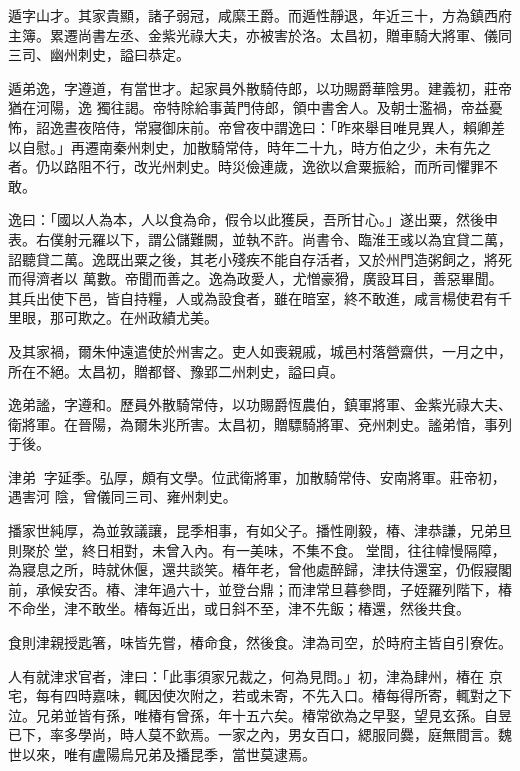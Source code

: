 \begin{pinyinscope}
 遁字山才。其家貴顯，諸子弱冠，咸縻王爵。而遁性靜退，年近三十，方為鎮西府主簿。累遷尚書左丞、金紫光祿大夫，亦被害於洛。太昌初，贈車騎大將軍、儀同三司、幽州刺史，謚曰恭定。



 遁弟逸，字遵道，有當世才。起家員外散騎侍郎，以功賜爵華陰男。建義初，莊帝猶在河陽，逸
 獨往謁。帝特除給事黃門侍郎，領中書舍人。及朝士濫禍，帝益憂怖，詔逸晝夜陪侍，常寢御床前。帝曾夜中謂逸曰：「昨來舉目唯見異人，賴卿差以自慰。」再遷南秦州刺史，加散騎常侍，時年二十九，時方伯之少，未有先之者。仍以路阻不行，改光州刺史。時災儉連歲，逸欲以倉粟振給，而所司懼罪不敢。



 逸曰：「國以人為本，人以食為命，假令以此獲戾，吾所甘心。」遂出粟，然後申表。右僕射元羅以下，謂公儲難闕，並執不許。尚書令、臨淮王彧以為宜貸二萬，詔聽貸二萬。逸既出粟之後，其老小殘疾不能自存活者，又於州門造粥飼之，將死而得濟者以
 萬數。帝聞而善之。逸為政愛人，尤憎豪猾，廣設耳目，善惡畢聞。其兵出使下邑，皆自持糧，人或為設食者，雖在暗室，終不敢進，咸言楊使君有千里眼，那可欺之。在州政績尤美。



 及其家禍，爾朱仲遠遣使於州害之。吏人如喪親戚，城邑村落營齋供，一月之中，所在不絕。太昌初，贈都督、豫郢二州刺史，謚曰貞。



 逸弟謐，字遵和。歷員外散騎常侍，以功賜爵恆農伯，鎮軍將軍、金紫光祿大夫、衛將軍。在晉陽，為爾朱兆所害。太昌初，贈驃騎將軍、兗州刺史。謐弟愔，事列于後。



 津弟，字延季。弘厚，頗有文學。位武衛將軍，加散騎常侍、安南將軍。莊帝初，遇害河
 陰，曾儀同三司、雍州刺史。



 播家世純厚，為並敦議讓，昆季相事，有如父子。播性剛毅，椿、津恭謙，兄弟旦則聚於堂，終日相對，未曾入內。有一美味，不集不食。堂間，往往幃慢隔障，為寢息之所，時就休偃，還共談笑。椿年老，曾他處醉歸，津扶侍還室，仍假寢閣前，承候安否。椿、津年過六十，並登台鼎；而津常旦暮參問，子姪羅列階下，椿不命坐，津不敢坐。椿每近出，或日斜不至，津不先飯；椿還，然後共食。



 食則津親授匙箸，味皆先嘗，椿命食，然後食。津為司空，於時府主皆自引寮佐。



 人有就津求官者，津曰：「此事須家兄裁之，何為見問。」初，津為肆州，椿在
 京宅，每有四時嘉味，輒因使次附之，若或未寄，不先入口。椿每得所寄，輒對之下泣。兄弟並皆有孫，唯椿有曾孫，年十五六矣。椿常欲為之早娶，望見玄孫。自昱已下，率多學尚，時人莫不欽焉。一家之內，男女百口，緦服同爨，庭無間言。魏世以來，唯有盧陽烏兄弟及播昆季，當世莫逮焉。




\end{pinyinscope}

